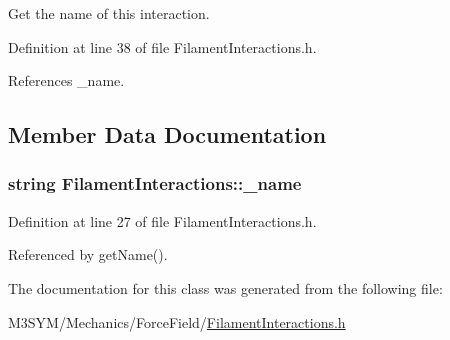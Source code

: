 Get the name of this interaction. 



Definition at line 38 of file Filament\+Interactions.\+h.



References \+\_\+name.



\subsection{Member Data Documentation}
\hypertarget{classFilamentInteractions_a5b2e160dc98547ff6613a989100083b5}{
\subsubsection[{\+\_\+name}]{\setlength{\rightskip}{0pt plus 5cm}string Filament\+Interactions\+::\+\_\+name\hspace{0.3cm}{\ttfamily [private]}}}\label{classFilamentInteractions_a5b2e160dc98547ff6613a989100083b5}


Definition at line 27 of file Filament\+Interactions.\+h.



Referenced by get\+Name().



The documentation for this class was generated from the following file\+:\begin{DoxyCompactItemize}
\item 
M3\+S\+Y\+M/\+Mechanics/\+Force\+Field/\hyperlink{FilamentInteractions_8h}{Filament\+Interactions.\+h}\end{DoxyCompactItemize}
